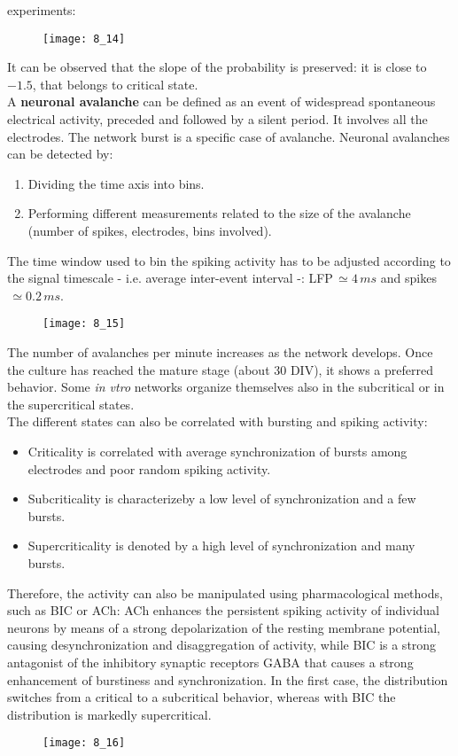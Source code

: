 experiments:
\begin{figure}[H]
    \texttt{[image: 8\_14]}
    \centering
\end{figure}
It can be observed that the slope of the probability is preserved: it is close to \(-1.5\),
that belongs to critical state.\\
A \textbf{neuronal avalanche} can be defined as an event of widespread spontaneous electrical
activity, preceded and followed by a silent period. It involves all the electrodes.
The network burst is a specific case of avalanche. Neuronal avalanches can be detected by:
\begin{enumerate}
    \item Dividing the time axis into bins.
    \item Performing different measurements related to the size of the avalanche
          (number of spikes, electrodes, bins involved).
\end{enumerate}
The time window used to bin the spiking activity has to be adjusted according to the
signal timescale - i.e. average inter-event interval -: LFP\(\,\simeq4\,ms\) and
spikes\(\,\simeq0.2\,ms\).
\begin{figure}[H]
    \texttt{[image: 8\_15]}
    \centering
\end{figure}
The number of avalanches per minute increases as the network develops. Once the culture has
reached the mature stage (about 30 DIV), it shows a preferred behavior. Some \textit{in vtro}
networks organize themselves also in the subcritical or in the supercritical states.\\
The different states can also be correlated with bursting and spiking activity:
\begin{itemize}
    \item Criticality is correlated with average synchronization of bursts among electrodes
          and poor random spiking activity.
    \item Subcriticality is characterizeby a low level of synchronization and a few bursts.
    \item Supercriticality is denoted by a high level of synchronization and many bursts.
\end{itemize}
Therefore, the activity can also be manipulated using pharmacological methods, such as BIC
or ACh: ACh enhances the persistent spiking activity of individual neurons by means of a
strong depolarization of the resting membrane potential, causing desynchronization and
disaggregation of activity, while BIC is a strong antagonist of the inhibitory synaptic
receptors GABA that causes a strong enhancement of burstiness and synchronization.
In the first case, the distribution switches from a critical to a subcritical behavior,
whereas with BIC the distribution is markedly supercritical.
\begin{figure}[H]
    \texttt{[image: 8\_16]}
    \centering
\end{figure}
